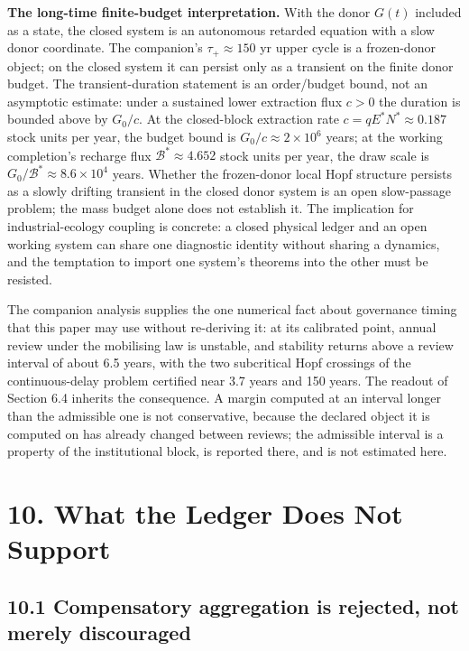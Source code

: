 \documentclass[11pt]{article}
\begin{document}
\textbf{The long-time finite-budget interpretation.} With the donor \(G(t)\) included as a state, the closed system is an autonomous retarded equation with a slow donor coordinate. The companion's \(\tau_+ \approx 150\) yr upper cycle is a frozen-donor object; on the closed system it can persist only as a transient on the finite donor budget. The transient-duration statement is an order/\allowbreak{}budget bound, not an asymptotic estimate: under a sustained lower extraction flux \(c > 0\) the duration is bounded above by \(G_0/\allowbreak{}c\). At the closed-block extraction rate \(c=qE^*N^*\approx0.187\) stock units per year, the budget bound is \(G_0/\allowbreak{}c\approx2\times10^{6}\) years; at the working completion's recharge flux \(\mathcal B^*\approx4.652\) stock units per year, the draw scale is \(G_0/\mathcal B^*\approx8.6\times10^{4}\) years. Whether the frozen-donor local Hopf structure persists as a slowly drifting transient in the closed donor system is an open slow-passage problem; the mass budget alone does not establish it. The implication for industrial-ecology coupling is concrete: a closed physical ledger and an open working system can share one diagnostic identity without sharing a dynamics, and the temptation to import one system's theorems into the other must be resisted.

The companion analysis supplies the one numerical fact about governance timing that this paper may use without re-deriving it: at its calibrated point, annual review under the mobilising law is unstable, and stability returns above a review interval of about 6.5 years, with the two subcritical Hopf crossings of the continuous-delay problem certified near 3.7 years and 150 years. The readout of Section 6.4 inherits the consequence. A margin computed at an interval longer than the admissible one is not conservative, because the declared object it is computed on has already changed between reviews; the admissible interval is a property of the institutional block, is reported there, and is not estimated here.

\vspace{0.8em}

\section*{10. What the Ledger Does Not Support}\label{10-what-the-ledger-does-not-support}

\subsection*{10.1 Compensatory aggregation is rejected, not merely discouraged}\label{101-compensatory-aggregation-is-rejected-not-merely-discouraged}
\end{document}
